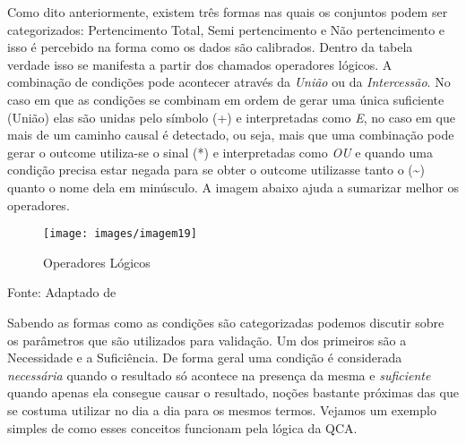 \documentclass[
	12pt,				%
	oneside,			%
	a4paper,			%
	sumario=tradicional,
	english,			%
	brazil				%
	]{abntex2}
\newcommand{\bcenter}{\begin{center}}
\newcommand{\ecenter}{\end{center}}
\begin{document}
Como dito anteriormente, existem três formas nas quais os conjuntos podem ser categorizados: Pertencimento Total, Semi pertencimento e Não pertencimento e isso é percebido na forma como os dados são calibrados. Dentro da tabela verdade isso se manifesta a partir dos chamados operadores lógicos. A combinação de condições pode acontecer através da \emph{União} ou da \emph{Intercessão}. No caso em que as condições se combinam em ordem de gerar uma única suficiente (União) elas são unidas pelo símbolo (+) e interpretadas como \emph{E}, no caso em que mais de um caminho causal é detectado, ou seja, mais que uma combinação pode gerar o outcome utiliza-se o sinal (*) e interpretadas como \emph{OU} e quando uma condição precisa estar negada para se obter o outcome utilizasse tanto o (\textasciitilde) quanto o nome dela em minúsculo. A imagem abaixo ajuda a sumarizar melhor os operadores.
\begin{figure}[H]

{\centering \texttt{[image: images/imagem19]} 

}

\caption{Operadores Lógicos}\label{fig:imagem19}
\end{figure}
\bcenter

Fonte: Adaptado de \autocite{betarelli_junior_introducao_2018}
\ecenter

Sabendo as formas como as condições são categorizadas podemos discutir sobre os parâmetros que são utilizados para validação. Um dos primeiros são a Necessidade e a Suficiência. De forma geral uma condição é considerada \emph{necessária} quando o resultado só acontece na presença da mesma e \emph{suficiente} quando apenas ela consegue causar o resultado, noções bastante próximas das que se costuma utilizar no dia a dia para os mesmos termos. Vejamos um exemplo simples de como esses conceitos funcionam pela lógica da QCA.
\end{document}
